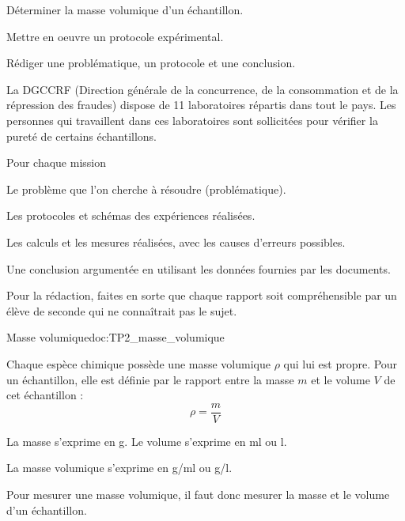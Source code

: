 \teteSndCorp




\begin{objectifs}
  \item Déterminer la masse volumique d'un échantillon.
  \item Mettre en oeuvre un protocole expérimental.
  \item Rédiger une problématique, un protocole et une conclusion.
\end{objectifs}


\begin{contexte}
  La \textsf{DGCCRF} (Direction générale de la concurrence, de la consommation et de la répression des fraudes) dispose de 11 laboratoires répartis dans tout le pays. 
  Les personnes qui travaillent dans ces laboratoires sont sollicitées pour vérifier la pureté de certains échantillons.
\end{contexte}


Pour chaque mission 
\begin{listePoints}
  \item Le problème que l'on cherche à résoudre (problématique).
  \item Les protocoles et schémas des expériences réalisées.
  \item Les calculs et les mesures réalisées, avec les causes d'erreurs possibles.
  \item Une conclusion argumentée en utilisant les données fournies par les documents.
\end{listePoints}

\flecheLongue Pour la rédaction, faites en sorte que chaque rapport soit compréhensible par un élève de seconde qui ne connaîtrait pas le sujet.


\begin{doc}{Masse volumique}{doc:TP2_masse_volumique}
  \begin{importants}
    Chaque espèce chimique possède une masse volumique $\rho$ qui lui est propre.
    Pour un échantillon, elle est définie par le rapport entre la masse $m$ et le volume $V$ de cet échantillon : 
    \begin{equation*}
      \rho = \dfrac{m}{V}
    \end{equation*}
  \end{importants}
  
  \begin{listePoints}
    \item La masse s'exprime en \unit{\g}.
    Le volume s'exprime en \unit{\ml} ou \unit{\litre}.
    \item La masse volumique s'exprime en \unit{\g/\ml} ou \unit{\g/\litre}.
  \end{listePoints}
  Pour mesurer une masse volumique, il faut donc mesurer la masse et le volume d'un échantillon.
\end{doc}

